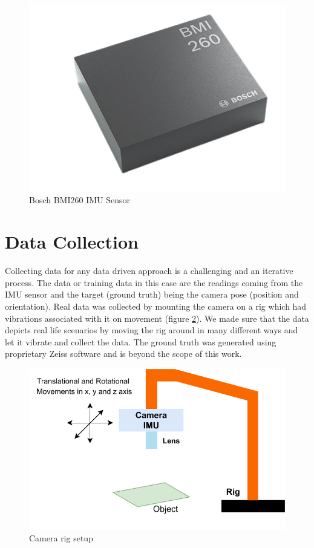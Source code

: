 \begin{figure}[H]
    \centering
    \includegraphics[scale=0.2]{images/fig_chapter4/bmi260.png}
    \caption{Bosch BMI260 IMU Sensor}
    \label{fig:imu_bmi260}
\end{figure}

\section{Data Collection}
Collecting data for any data driven approach is a challenging and an iterative process. The data or training data in this case are the readings coming from the IMU sensor and the target (ground truth) being the camera pose (position and orientation). Real data was collected by mounting the camera on a rig which had vibrations associated with it on movement (figure \ref{fig:camera_rig}). We made sure that the data depicts real life scenarios by moving the rig around in many different ways and let it vibrate and collect the data. The ground truth was generated using proprietary Zeiss software and is beyond the scope of this work. 

\begin{figure}[H]
    \centering
    \includegraphics[scale=0.8]{images/fig_chapter4/camera_rig.pdf}
    \caption{Camera rig setup}
    \label{fig:camera_rig}
\end{figure}

